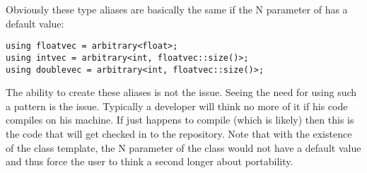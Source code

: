 Obviously these type aliases are basically the same if the \code N parameter of  has a default value:
\smallskip\begin{lstlisting}[style=Vc]
using floatvec = arbitrary<float>;
using intvec = arbitrary<int, floatvec::size()>;
using doublevec = arbitrary<int, floatvec::size()>;
\end{lstlisting}
The ability to create these aliases is not the issue.
Seeing the need for using such a pattern is the issue.
Typically a developer will think no more of it if his code compiles on his machine.
If  just happens to compile (which is likely) then this is the code that will get checked in to the repository.
Note that with the existence of the  class template, the \code N parameter of the  class would not have a default value and thus force the user to think a second longer about portability.

